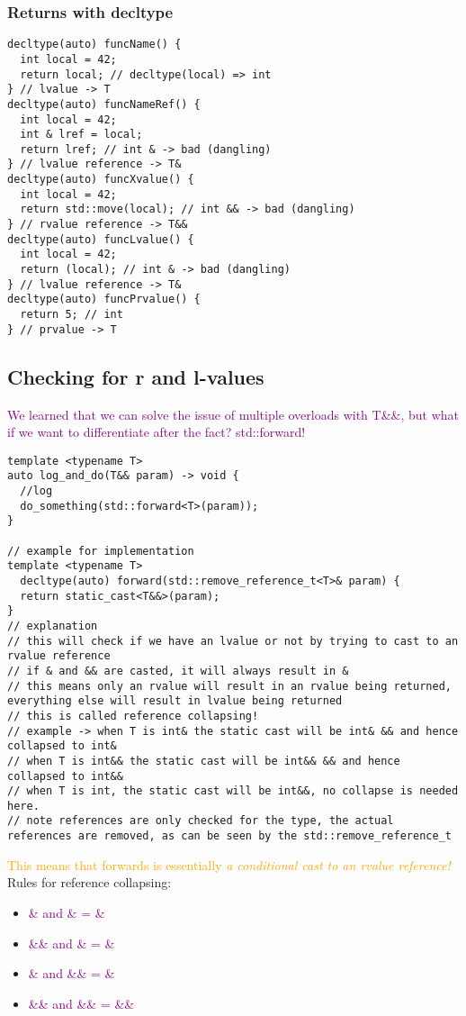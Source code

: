 \documentclass[main.tex,fontsize=8pt,paper=a4,paper=portrait,DIV=calc,]{scrartcl}
\begin{document}
\subsubsection{Returns with decltype}
\begin{lstlisting}
decltype(auto) funcName() {
  int local = 42;
  return local; // decltype(local) => int
} // lvalue -> T
decltype(auto) funcNameRef() {
  int local = 42;
  int & lref = local;
  return lref; // int & -> bad (dangling)
} // lvalue reference -> T&
decltype(auto) funcXvalue() {
  int local = 42;
  return std::move(local); // int && -> bad (dangling)
} // rvalue reference -> T&&
decltype(auto) funcLvalue() {
  int local = 42;
  return (local); // int & -> bad (dangling)
} // lvalue reference -> T&
decltype(auto) funcPrvalue() {
  return 5; // int
} // prvalue -> T
\end{lstlisting}

\subsection{Checking for r and l-values}
\textcolor{purple}{We learned that we can solve the issue of multiple overloads with T\&\&, but what if we want to differentiate after the fact? std::forward!}
\begin{lstlisting}
template <typename T>
auto log_and_do(T&& param) -> void {
  //log
  do_something(std::forward<T>(param));
}

// example for implementation
template <typename T>
  decltype(auto) forward(std::remove_reference_t<T>& param) {
  return static_cast<T&&>(param);
}
// explanation
// this will check if we have an lvalue or not by trying to cast to an rvalue reference
// if & and && are casted, it will always result in &
// this means only an rvalue will result in an rvalue being returned, everything else will result in lvalue being returned
// this is called reference collapsing!
// example -> when T is int& the static cast will be int& && and hence collapsed to int&
// when T is int&& the static cast will be int&& && and hence collapsed to int&&
// when T is int, the static cast will be int&&, no collapse is needed here.
// note references are only checked for the type, the actual references are removed, as can be seen by the std::remove_reference_t
\end{lstlisting}
\textcolor{orange}{This means that forwards is essentially \emph{a conditional cast to an rvalue reference!}}\newline
Rules for reference collapsing:
\begin{itemize}
  \item \textcolor{purple}{\& and \& = \&}
  \item \textcolor{purple}{\&\& and \& = \&}
  \item \textcolor{purple}{\& and \&\& = \&}
  \item \textcolor{purple}{\&\& and \&\& = \&\&}
\end{itemize} 
\end{document}
